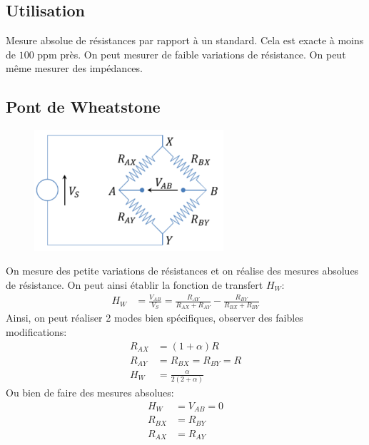 \documentclass{report}
\begin{document}
\subsection{Utilisation}
Mesure absolue de résistances par rapport à un standard. Cela est exacte à moins de $100$ ppm près. On peut mesurer de faible variations de résistance. On peut même mesurer des impédances.

\subsection{Pont de Wheatstone}
\begin{figure}
\centering
\includegraphics[width=7cm]{img/Wheatstone.png}
\end{figure}
On mesure des petite variations de résistances et on
 réalise des mesures absolues de résistance. On peut ainsi établir la fonction de transfert $H_W$:
\begin{align*}
H_W &= \frac{V_{AB}}{V_S} = \frac{R_{AY}}{R_{AX} + R_{AY}} - \frac{R_{BY}}{R_{BX} + R_{BY}}
\end{align*}
Ainsi, on peut réaliser 2 modes bien spécifiques, observer des faibles modifications:
\begin{align*}
R_{AX} &= (1 + \alpha) R\\
R_{AY} &= R_{BX} = R_{BY} = R\\
H_W &= \frac{\alpha}{2(2+\alpha)}
\end{align*}
Ou bien de faire des mesures absolues:
\begin{align*}
H_W &= V_{AB} = 0\\
R_{BX} &= R_{BY}\\
R_{AX} &= R_{AY}
\end{align*}
\end{document}
